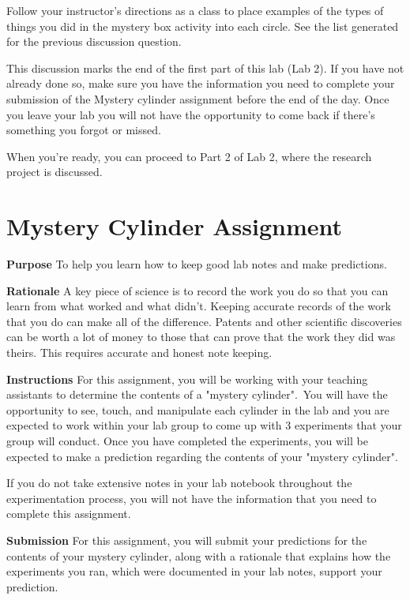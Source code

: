 \documentclass[
]{book}
\begin{document}
Follow your instructor's directions as a class to place examples of the types of things you did in the mystery box activity into each circle. See the list generated for the previous discussion question.

This discussion marks the end of the first part of this lab (Lab 2). If you have not already done so, make sure you have the information you need to complete your submission of the Mystery cylinder assignment before the end of the day. Once you leave your lab you will not have the opportunity to come back if there's something you forgot or missed.

When you're ready, you can proceed to Part 2 of Lab 2, where the research project is discussed.

\hypertarget{mystery-cylinder-assignment}{%
\section*{Mystery Cylinder Assignment}\label{mystery-cylinder-assignment}}

\textbf{Purpose} To help you learn how to keep good lab notes and make predictions.

\textbf{Rationale} A key piece of science is to record the work you do so that you can learn from what worked and what didn't. Keeping accurate records of the work that you do can make all of the difference. Patents and other scientific discoveries can be worth a lot of money to those that can prove that the work they did was theirs. This requires accurate and honest note keeping.

\textbf{Instructions} For this assignment, you will be working with your teaching assistants to determine the contents of a "mystery cylinder".\, You will have the opportunity to see, touch, and manipulate each cylinder in the lab and you are expected to work within your lab group to come up with 3 experiments that your group will conduct. Once you have completed the experiments, you will be expected to make a prediction regarding the contents of your "mystery cylinder".

If you do not take extensive notes in your lab notebook throughout the experimentation process, you will not have the information that you need to complete this assignment. \,

\textbf{Submission} For this assignment, you will submit your predictions for the contents of your mystery cylinder, along with a rationale that explains how the experiments you ran, which were documented in your lab notes, support your prediction.
\end{document}
